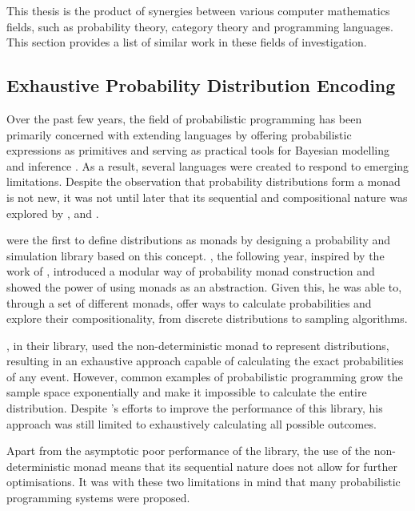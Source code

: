 \documentclass[
  oneside,
  11pt, a4paper,
  footinclude=true,
  headinclude=true,
  cleardoublepage=empty
]{scrbook}
\theoremstyle{definition}
\theoremstyle{definition}
\begin{document}
            This thesis is the product of synergies between various computer mathematics fields, such as probability theory, category theory and programming languages. This section provides a list of similar work in these fields of investigation.

        \subsection{Exhaustive Probability Distribution Encoding}
        
    Over the past few years, the field of probabilistic programming has been primarily concerned with extending languages by offering probabilistic expressions as primitives and serving as practical tools for Bayesian modelling and inference \citep{erwig_kollmansberger_2006}. As a result, several languages were created to respond to emerging limitations. Despite the observation that probability distributions form a monad is not new, it was not until later that its sequential and compositional nature was explored by \cite{Ramsey:2002:SLC:565816.503288}, \cite{Goodman:2013:PPP:2480359.2429117} and \cite{Gordon:2013:MPB:2429069.2429119}.
        
        \cite{erwig_kollmansberger_2006} were the first to define distributions as monads by designing a probability and simulation library based on this concept. \cite{kidd2007build}, the following year, inspired by the work of \cite{Ramsey:2002:SLC:565816.503288}, introduced a modular way of probability monad construction and showed the power of using monads as an abstraction. Given this, he was able to, through a set of different monads, offer ways to calculate probabilities and explore their compositionality, from discrete distributions to sampling algorithms.
                
         \cite{erwig_kollmansberger_2006}, in their library, used the non-deterministic monad to represent distributions, resulting in an exhaustive approach capable of calculating the exact probabilities of any event. However, common examples of probabilistic programming grow the sample space exponentially and make it impossible to calculate the entire distribution. Despite \cite{larsen2011memory}'s efforts to improve the performance of this library, his approach was still limited to exhaustively calculating all possible outcomes.
                
         Apart from the asymptotic poor performance of the \cite{erwig_kollmansberger_2006} library, the use of the non-deterministic monad means that its sequential nature does not allow for further optimisations. It was with these two limitations in mind that many probabilistic programming systems were proposed.
        
\end{document}
